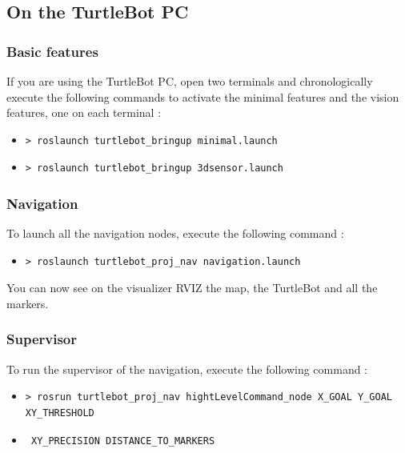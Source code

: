 \documentclass[10pt,a4paper]{article}
\begin{document}
\subsection{On the TurtleBot PC}

\subsubsection{Basic features}

If you are using the TurtleBot PC, open two terminals and chronologically execute the following commands to activate the minimal features and the vision features, one on each terminal :

\begin{itemize}
\item[]  \begin{verbatim}> roslaunch turtlebot_bringup minimal.launch \end{verbatim}
\item[]  \begin{verbatim}> roslaunch turtlebot_bringup 3dsensor.launch \end{verbatim}
\end{itemize}

\subsubsection{Navigation}

To launch all the navigation nodes, execute the following command :

\begin{itemize}
\item[]  \begin{verbatim}> roslaunch turtlebot_proj_nav navigation.launch \end{verbatim}
\end{itemize}

You can now see on the visualizer RVIZ the map, the TurtleBot and all the markers.

\subsubsection{Supervisor}

To run the supervisor of the navigation, execute the following command :

\begin{itemize}
\item[]  \begin{verbatim}> rosrun turtlebot_proj_nav hightLevelCommand_node X_GOAL Y_GOAL XY_THRESHOLD  \end{verbatim}
\item[]  \begin{verbatim} XY_PRECISION DISTANCE_TO_MARKERS \end{verbatim}
\end{itemize}
\end{document}
